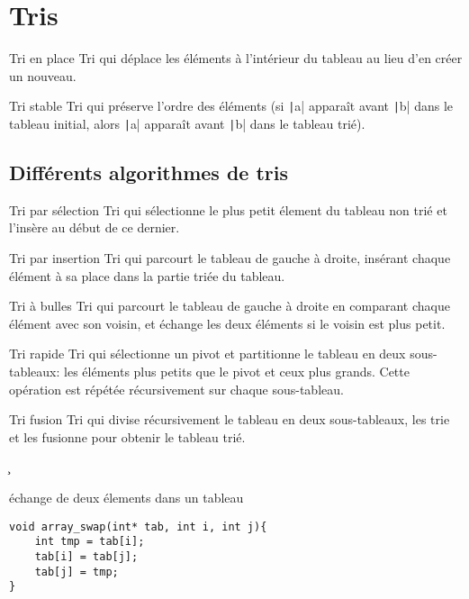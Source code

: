 \section{Tris}
\begin{df*}{Tri en place}
Tri qui déplace les éléments à l'intérieur du tableau au lieu d'en créer un nouveau.
\end{df*}
\begin{df*}{Tri stable}
Tri qui préserve l'ordre des éléments (si \texttt|a| apparaît avant \texttt|b| dans le tableau initial, alors \texttt|a| apparaît avant \texttt|b| dans le tableau trié).
\end{df*}
\subsection{Différents algorithmes de tris}
\begin{df*}{Tri par sélection}
Tri qui sélectionne le plus petit élement du tableau non trié et l'insère au début de ce dernier.
\end{df*}
\begin{df*}{Tri par insertion}
Tri qui parcourt le tableau de gauche à droite, insérant chaque élément à sa place dans la partie triée du tableau.
\end{df*}
\begin{df*}{Tri à bulles}
Tri qui parcourt le tableau de gauche à droite en comparant chaque élément avec son voisin, et échange les deux éléments si le voisin est plus petit.
\end{df*}
\begin{df*}{Tri rapide}
Tri qui sélectionne un pivot et partitionne le tableau en deux sous-tableaux: les éléments plus petits que le pivot et ceux plus grands. Cette opération est répétée récursivement sur chaque sous-tableau.
\end{df*}
\begin{df*}{Tri fusion}
Tri qui divise récursivement le tableau en deux sous-tableaux, les trie et les fusionne pour obtenir le tableau trié.
\end{df*}
\c
\begin{imp*}{échange de deux élements dans un tableau}
\begin{verbatim}
void array_swap(int* tab, int i, int j){
    int tmp = tab[i];
    tab[i] = tab[j];
    tab[j] = tmp;
}
\end{verbatim}
\end{imp*}
